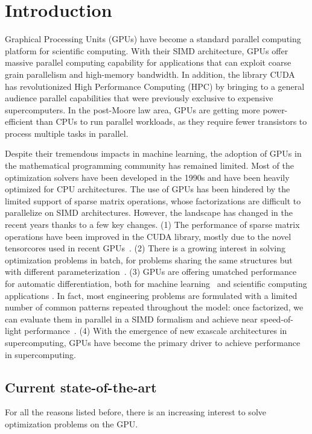 \section{Introduction}
Graphical Processing Units (GPUs) have become a standard parallel computing platform
for scientific computing. With their SIMD architecture,
GPUs offer massive parallel computing capability for applications
that can exploit coarse grain parallelism and high-memory bandwidth.
In addition, the library CUDA has revolutionized High Performance Computing (HPC)
by bringing to a general audience parallel capabilities that were previously
exclusive to expensive supercomputers. In the post-Moore law area, GPUs
are getting more power-efficient than CPUs to run parallel workloads, as they require
fewer transistors to process multiple tasks in parallel.

Despite their tremendous impacts in machine learning, the
adoption of GPUs in the mathematical programming community has
remained limited. Most of the optimization solvers have been developed
in the 1990s and have been heavily optimized for CPU architectures.
The use of GPUs has been hindered by the limited support of
sparse matrix operations, whose factorizations are difficult to parallelize
on SIMD architectures. However, the landscape has changed in the
recent years thanks to a few key changes.
(1) The performance of sparse matrix operations have been improved
in the CUDA library, mostly due to the novel tensorcores used
in recent GPUs~\cite{markidis2018nvidia}.
(2) There is a growing interest in solving optimization
problems in batch, for problems sharing the same
structures but with different parameterization~\cite{amos2017optnet,pineda2022theseus}.
(3) GPUs are offering umatched performance for automatic differentiation,
both for machine learning~\cite{jax2018github} and scientific computing applications \cite{enzyme2021}.
In fact, most engineering problems are formulated with a limited
number of common patterns repeated throughout the model: once
factorized, we can evaluate them in parallel in a SIMD formalism
and achieve near speed-of-light performance~\cite{shin2023accelerating}.
(4) With the emergence of new exascale architectures in supercomputing,
GPUs have become the primary driver to achieve performance in
supercomputing.

\subsection{Current state-of-the-art}
For all the reasons listed before, there is an increasing interest
to solve optimization problems on the GPU.

